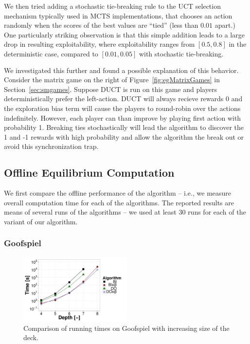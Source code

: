 We then tried adding a stochastic tie-breaking rule to the UCT selection mechanism typically used in MCTS implementations, that chooses an 
action randomly when the scores of the best values are ``tied'' (less than $0.01$ apart.)
One particularly striking observation is that this simple addition leads to a large drop in resulting exploitability, where exploitability
ranges from $[0.5,0.8]$ in the deterministic case, compared to $[0.01,0.05]$ with stochastic tie-breaking. 

We investigated this further and found a possible
explanation of this behavior. Consider the matrix game on the right of Figure~\ref{fig:egMatrixGames} in Section~\ref{sec:smgames}.
Suppose DUCT is run on this game and players deterministically prefer the left-action. 
DUCT will always recieve rewards 0 and the exploration bias term will cause the players to round-robin over the actions indefinitely. 
However, each player can than improve by playing first action with probability 1. Breaking ties stochastically will lead the algorithm to 
discover the 1 and -1 rewards with high probability and allow the algorithm the break out or avoid this synchronization trap.

\subsection{Offline Equilibrium Computation}
We first compare the offline performance of the algorithm -- i.e., we measure overall computation time for each of the algorithms. 
The reported results are means of several runs of the algorithms -- we used at least $30$ runs for each of the variant of our algorithm. 

\subsubsection{Goofspiel}
\begin{figure}
\centering
\includegraphics[width=0.5\textwidth]{figures/GS.pdf}
\caption{Comparison of running times on Goofspiel with increasing size of the deck.} \label{fig:off:res:gs}
\end{figure}

